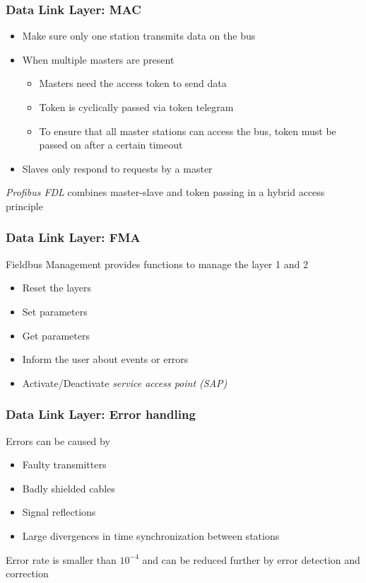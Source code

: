 \documentclass{beamer}
\begin{document}
\begin{frame}
  \frametitle{Data Link Layer: MAC}
  \begin{itemize}
    \item Make sure only one station transmits data on the bus
    \item When multiple masters are present
      \begin{itemize}
        \item Masters need the access token to send data
        \item Token is cyclically passed via token telegram
        \item To ensure that all master stations can access the bus, token must be passed
          on after a certain timeout
      \end{itemize}
    \item Slaves only respond to requests by a master
  \end{itemize}
  \textit{Profibus FDL} combines master-slave and token passing in a hybrid access principle
\end{frame}

\begin{frame}
  \frametitle{Data Link Layer: FMA}
  Fieldbus Management provides functions to manage the layer 1 and 2
    \begin{itemize}
      \item Reset the layers
      \item Set parameters
      \item Get parameters
      \item Inform the user about events or errors
      \item Activate/Deactivate \textit{service access point (SAP)}
    \end{itemize}
\end{frame}

\begin{frame}
  \frametitle{Data Link Layer: Error handling}
  Errors can be caused by
  \begin{itemize}
    \item Faulty transmitters
    \item Badly shielded cables
    \item Signal reflections
    \item Large divergences in time synchronization between stations
  \end{itemize}
  Error rate is smaller than $10^{-4}$ and can be reduced further by error detection and
  correction
\end{frame}
\end{document}
